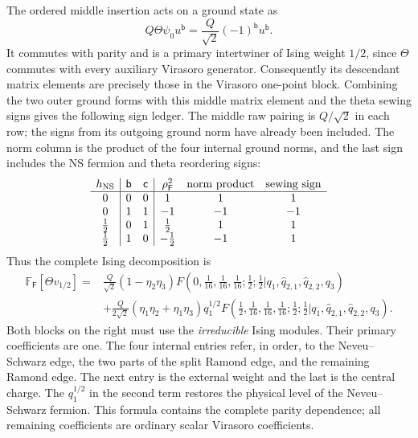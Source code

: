 The ordered middle insertion acts on a ground state as
\begin{equation}
 Q\Theta\psi_0u^{\mathsf b}
 =\frac{Q}{\sqrt2}(-1)^{\mathsf b}u^{\mathsf b}.
\end{equation}
It commutes with parity and is a primary intertwiner of Ising weight
$1/2$, since $\Theta$ commutes with every auxiliary Virasoro generator.
Consequently its descendant matrix elements are precisely those in the
Virasoro one-point block.  Combining the two outer ground forms with
this middle matrix element and the theta sewing signs gives
the following sign ledger.  The middle raw pairing is $Q/\sqrt2$
in each row; the signs from its outgoing ground norm have already
been included.  The norm column is the product of the four internal
ground norms, and the last sign includes the NS fermion and theta
reordering signs:
\[
\begin{array}{c|cc|ccc}
 h_{\mathrm{NS}}&\mathsf b&\mathsf c&\rho_{\mathsf F}^{2}
 &\text{norm product}&\text{sewing sign}\\\hline
 0&0&0&1&1&1\\
 0&1&1&-1&-1&-1\\
 \tfrac12&0&1&\tfrac12&1&1\\
 \tfrac12&1&0&-\tfrac12&-1&1
\end{array}
\]
Thus the complete Ising decomposition is
\begin{align}
 \mathbb F_{\mathsf F}[\Theta v_{1/2}]
 ={}&\frac{Q}{\sqrt2}(1-\eta_2\eta_3)
 F\left(0,\frac1{16},\frac1{16},\frac1{16};\frac12;\frac12
 \mathrel\big|q_1,\hat q_{2,1},\hat q_{2,2},q_3\right)\nonumber\\
 &+\frac{Q}{2\sqrt2}(\eta_1\eta_2+\eta_1\eta_3)q_1^{1/2}
 F\left(\frac12,\frac1{16},\frac1{16},\frac1{16};\frac12;\frac12
 \mathrel\big|q_1,\hat q_{2,1},\hat q_{2,2},q_3\right).
 \label{eq:ising-ordered-theta-decomposition}
\end{align}
Both blocks on the right must use the \emph{irreducible} Ising modules.
Their primary coefficients are one.  The four internal entries refer,
in order, to the Neveu--Schwarz edge, the two parts of the split Ramond
edge, and the remaining Ramond edge.  The next entry is the external
weight and the last is the central charge.  The $q_1^{1/2}$ in the
second term restores the physical level of the Neveu--Schwarz fermion.
This formula contains the complete parity dependence; all remaining
coefficients are ordinary scalar Virasoro coefficients.
